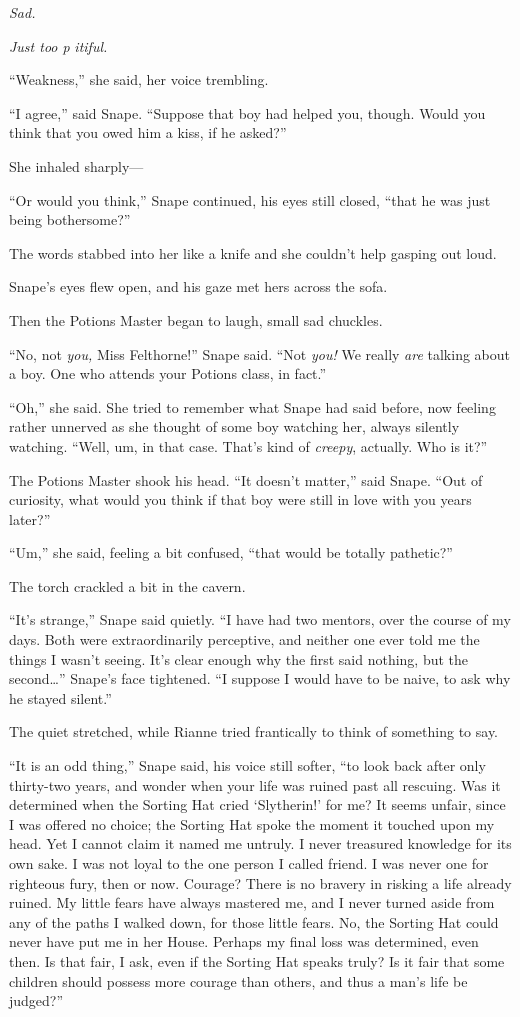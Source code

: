 \emph{Sad.}

\emph{Just too p} \emph{itiful.}

``Weakness,'' she said, her voice trembling.

``I agree,'' said Snape. ``Suppose that boy had helped you, though.
Would you think that you owed him a kiss, if he asked?''

She inhaled sharply---

``Or would you think,'' Snape continued, his eyes still closed, ``that
he was just being bothersome?''

The words stabbed into her like a knife and she couldn't help gasping
out loud.

Snape's eyes flew open, and his gaze met hers across the sofa.

Then the Potions Master began to laugh, small sad chuckles.

``No, not \emph{you,} Miss Felthorne!'' Snape said. ``Not \emph{you!} We
really \emph{are} talking about a boy. One who attends your Potions
class, in fact.''

``Oh,'' she said. She tried to remember what Snape had said before, now
feeling rather unnerved as she thought of some boy watching her, always
silently watching. ``Well, um, in that case. That's kind of
\emph{creepy}, actually. Who is it?''

The Potions Master shook his head. ``It doesn't matter,'' said Snape.
``Out of curiosity, what would you think if that boy were still in love
with you years later?''

``Um,'' she said, feeling a bit confused, ``that would be totally
pathetic?''

The torch crackled a bit in the cavern.

``It's strange,'' Snape said quietly. ``I have had two mentors, over the
course of my days. Both were extraordinarily perceptive, and neither one
ever told me the things I wasn't seeing. It's clear enough why the first
said nothing, but the second\ldots{}'' Snape's face tightened. ``I
suppose I would have to be naive, to ask why he stayed silent.''

The quiet stretched, while Rianne tried frantically to think of
something to say.

``It is an odd thing,'' Snape said, his voice still softer, ``to look
back after only thirty-two years, and wonder when your life was ruined
past all rescuing. Was it determined when the Sorting Hat cried
`Slytherin!' for me? It seems unfair, since I was offered no choice; the
Sorting Hat spoke the moment it touched upon my head. Yet I cannot claim
it named me untruly. I never treasured knowledge for its own sake. I was
not loyal to the one person I called friend. I was never one for
righteous fury, then or now. Courage? There is no bravery in risking a
life already ruined. My little fears have always mastered me, and I
never turned aside from any of the paths I walked down, for those little
fears. No, the Sorting Hat could never have put me in her House. Perhaps
my final loss was determined, even then. Is that fair, I ask, even if
the Sorting Hat speaks truly? Is it fair that some children should
possess more courage than others, and thus a man's life be judged?''

